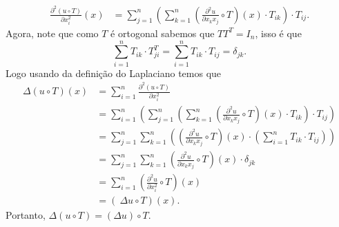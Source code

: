 \begin{homeworkProblem}[Seção 2-10]
\begin{solution}
    \begin{align*}
      \frac{\partial^{2} (u\circ T)}{\partial x_i^{2}}(x)&=\sum_{j=1}^{n}\left( \sum_{k=1}^{n}\left( \frac{\partial^{2}u }{\partial x_kx_j}\circ T\right) (x)\cdot T_{ik}\right)\cdot T_{ij}.
    \end{align*}
    Agora, note que como $T$ é ortogonal sabemos que $TT^{T}=I_n$, isso é que 
    $$\displaystyle \sum_{i=1}^{n}T_{ik}\cdot T^{T}_{ji}=\sum_{i=1}^{n}T_{ik}\cdot T_{ij}=\delta_{jk}.$$
    Logo usando da definição do Laplaciano temos que
    \begin{align*}
      \Delta(u\circ T)(x)&=\sum_{i=1}^{n}\frac{\partial^{2} (u\circ T)}{\partial x_i^{2}}\\
      &=\sum_{i=1}^{n}\left(\sum_{j=1}^{n}\left( \sum_{k=1}^{n}\left( \frac{\partial^{2}u }{\partial x_kx_j}\circ T\right) (x)\cdot T_{ik}\right)\cdot T_{ij}\right)\\
      &=\sum_{j=1}^{n}\sum_{k=1}^{n}\left(\left( \frac{\partial^{2} u}{\partial x_kx_j}\circ T \right)(x)\cdot \left(\sum_{i=1}^{n}T_{ik}\cdot T_{ij}\right)\right)\\
      &=\sum_{j=1}^{n}\sum_{k=1}^{n}\left( \frac{\partial^{2} u}{\partial x_kx_j}\circ T \right)(x)\cdot \delta_{jk}\\
      &=\sum_{i=1}^{n}\left( \frac{\partial^{2}u }{\partial x_{i}^{2}}\circ T \right)(x)\\
      &=\left(\ \Delta u \circ T\right)(x).
    \end{align*}
    Portanto, $\Delta(u\circ T)=\left( \Delta u \right)\circ T$.
  \end{solution}
\end{homeworkProblem}
